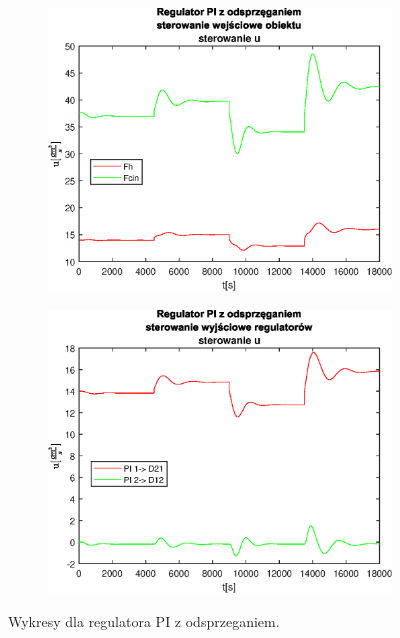 \begin{figure}[h!]
   \begin{subfigure}[b]{0.4\textwidth}
      \includegraphics[width=1\linewidth]{img/PI/decoupler/noDisturbance/PIDecouplerControl2Linfalse.eps}
      \caption{}
      \label{fig:fig:PIDecoupler2Linfalse3}
   \end{subfigure}
       
   \begin{subfigure}[b]{0.4\textwidth}
      \includegraphics[width=1\linewidth]{img/PI/decoupler/noDisturbance/PIDecouplerControlD2Linfalse.eps}
      \caption{}
      \label{fig:fig:PIDecoupler2Linfalse4}
   \end{subfigure}
       
   \caption{Wykresy dla regulatora PI z odsprzeganiem.}
   \label{fig:PIDecoupler2Linfalse}
\end{figure}
           
